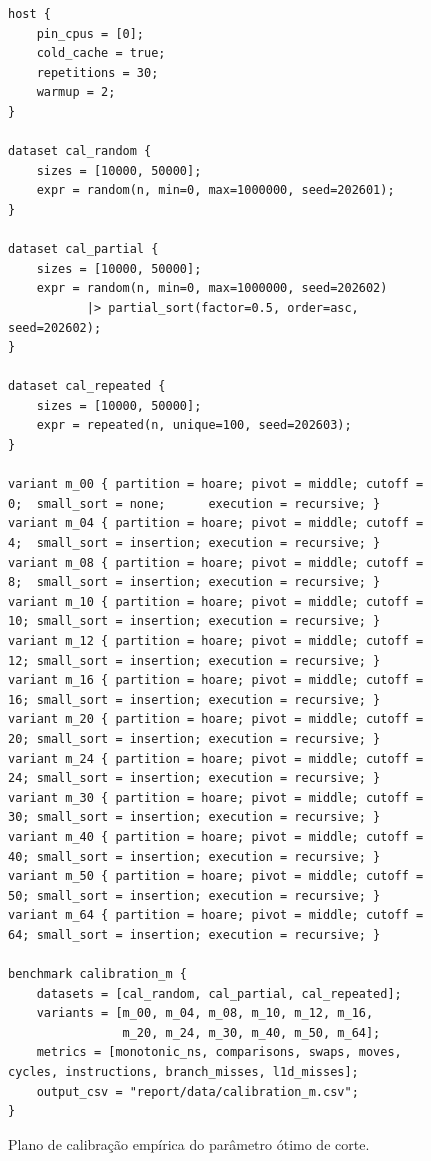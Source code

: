 \documentclass[12pt]{article}
\begin{document}
\begin{figure}[htbp]
\centering
\begin{verbatim}
host {
	pin_cpus = [0];
	cold_cache = true;
	repetitions = 30;
	warmup = 2;
}

dataset cal_random {
	sizes = [10000, 50000];
	expr = random(n, min=0, max=1000000, seed=202601);
}

dataset cal_partial {
	sizes = [10000, 50000];
	expr = random(n, min=0, max=1000000, seed=202602)
	       |> partial_sort(factor=0.5, order=asc, seed=202602);
}

dataset cal_repeated {
	sizes = [10000, 50000];
	expr = repeated(n, unique=100, seed=202603);
}

variant m_00 { partition = hoare; pivot = middle; cutoff = 0;  small_sort = none;      execution = recursive; }
variant m_04 { partition = hoare; pivot = middle; cutoff = 4;  small_sort = insertion; execution = recursive; }
variant m_08 { partition = hoare; pivot = middle; cutoff = 8;  small_sort = insertion; execution = recursive; }
variant m_10 { partition = hoare; pivot = middle; cutoff = 10; small_sort = insertion; execution = recursive; }
variant m_12 { partition = hoare; pivot = middle; cutoff = 12; small_sort = insertion; execution = recursive; }
variant m_16 { partition = hoare; pivot = middle; cutoff = 16; small_sort = insertion; execution = recursive; }
variant m_20 { partition = hoare; pivot = middle; cutoff = 20; small_sort = insertion; execution = recursive; }
variant m_24 { partition = hoare; pivot = middle; cutoff = 24; small_sort = insertion; execution = recursive; }
variant m_30 { partition = hoare; pivot = middle; cutoff = 30; small_sort = insertion; execution = recursive; }
variant m_40 { partition = hoare; pivot = middle; cutoff = 40; small_sort = insertion; execution = recursive; }
variant m_50 { partition = hoare; pivot = middle; cutoff = 50; small_sort = insertion; execution = recursive; }
variant m_64 { partition = hoare; pivot = middle; cutoff = 64; small_sort = insertion; execution = recursive; }

benchmark calibration_m {
	datasets = [cal_random, cal_partial, cal_repeated];
	variants = [m_00, m_04, m_08, m_10, m_12, m_16,
	            m_20, m_24, m_30, m_40, m_50, m_64];
	metrics = [monotonic_ns, comparisons, swaps, moves, cycles, instructions, branch_misses, l1d_misses];
	output_csv = "report/data/calibration_m.csv";
}
\end{verbatim}
\caption{Plano de calibração empírica do parâmetro ótimo de corte.}
\label{fig:dsl-calibration}
\end{figure}
\end{document}
